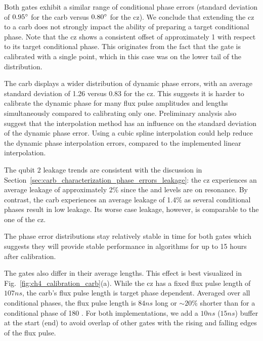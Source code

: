 Both gates exhibit a similar range of conditional phase errors (standard deviation of $0.95^\circ{}$ for the \gls{carb} versus $0.80^\circ{}$ for the \gls{cz}). We conclude that extending the \gls{cz} to a \gls{carb} does not strongly impact the ability of preparing a target conditional phase. Note that the \gls{cz} shows a consistent offset of approximately 1\degree{} with respect to its target conditional phase. This originates from the fact that the gate is calibrated with a single point, which in this case was on the lower tail of the distribution. 

The \gls{carb} displays a wider distribution of dynamic phase errors, with an average standard deviation of 1.26\degree{} versus 0.83\degree{} for the \gls{cz}. This suggests it is harder to calibrate the dynamic phase for many flux pulse amplitudes and lengths simultaneously compared to calibrating only one. Preliminary analysis also suggest that the interpolation method has an influence on the standard deviation of the dynamic phase error. Using a cubic spline interpolation could help reduce the dynamic phase interpolation errors, compared to the implemented linear interpolation. 

The qubit 2 leakage trends are consistent with the discussion in Section~\ref{sec:carb_characterization_phase_errors_leakage}: the \gls{cz} experiences an average leakage of approximately 2\% since the \oo{} and \tz{} levels are on resonance. By contrast, the \gls{carb} experiences an average leakage of 1.4\% as several conditional phases result in low leakage. Its worse case leakage, however, is comparable to the one of the \gls{cz}. 

The phase error distributions stay relatively stable in time for both gates which suggests they will provide stable performance in algorithms for up to 15 hours after calibration.

The gates also differ in their average lengths. This effect is best visualized in Fig.~\ref{fig:ch4_calibration_carb}(a). While the \gls{cz} has a fixed flux pulse length of $107\unit{ns}$, the \gls{carb}'s flux pulse length is target phase dependent.  Averaged over all conditional phases, the flux pulse length is $84\unit{ns}$ long or $\sim 20\%$ shorter than for a conditional phase of 180 \degree. For both implementations, we add a $10\unit{ns}$ ($15\unit{ns}$) buffer at the start (end) to avoid overlap of other gates with the rising and falling edges of the flux pulse.

